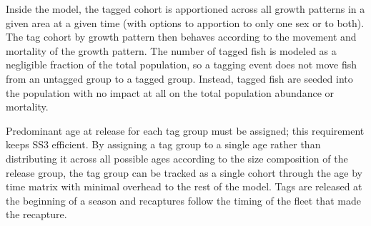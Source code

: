 Inside the model, the tagged cohort is apportioned across all growth patterns in a given area at a given time (with options to apportion to only one sex or to both). The tag cohort by growth pattern then behaves according to the movement and mortality of the growth pattern. The number of tagged fish is modeled as a negligible fraction of the total population, so a tagging event does not move fish from an untagged group to a tagged group. Instead, tagged fish are seeded into the population with no impact at all on the total population abundance or mortality. 

Predominant age at release for each tag group must be assigned; this requirement keeps SS3 efficient. By assigning a tag group to a single age rather than distributing it across all possible ages according to the size composition of the release group, the tag group can be tracked as a single cohort through the age by time matrix with minimal overhead to the rest of the model. Tags are released at the beginning of a season and recaptures follow the timing of the fleet that made the recapture.

